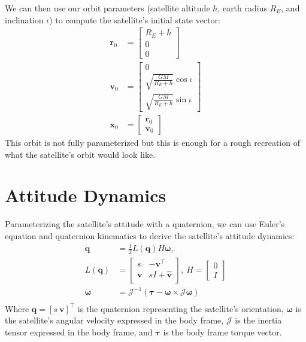 \documentclass[11pt]{article}
\begin{document}
We can then use our orbit parameters (satellite altitude $h$, earth radius $R_E$, and inclination $\iota$) to compute the satellite's initial state vector:
\begin{align*}
  \mathbf{r}_0 &= \begin{bmatrix} R_E + h \\ 0 \\ 0 \end{bmatrix} \\
  \mathbf{v}_0 &= \begin{bmatrix} 0 \\ \sqrt{\frac{GM}{R_E + h}} \cos\iota \\ \sqrt{\frac{GM}{R_E + h}} \sin\iota \end{bmatrix} \\
  \mathbf{x}_0 &= \begin{bmatrix} \mathbf{r}_0 \\ \mathbf{v}_0 \end{bmatrix}
\end{align*}
This orbit is not fully parameterized but this is enough for a rough recreation of what the satellite's orbit would look like.

\section{Attitude Dynamics}
Parameterizing the satellite's attitude with a quaternion, we can use Euler's equation and quaternion kinematics to derive the satellite's attitude dynamics:
\begin{align*}
  \dot{\mathbf{q}} &= \frac{1}{2} L(\mathbf{q}) H \boldsymbol{\omega}, \\ 
  L(\mathbf{q}) &= \begin{bmatrix}
    s & -\mathbf{v}^\top \\
    \mathbf{v} & sI + \mathbf{\hat{v}} \\
    \end{bmatrix}, \ 
    H = \begin{bmatrix}
      0 \\ I
  \end{bmatrix} \\
  \dot{\boldsymbol{\omega}} &= \mathcal{J}^{-1} \left( \boldsymbol{\tau} - \boldsymbol{\omega} \times \mathcal{J}\boldsymbol{\omega} \right) \\
\end{align*}
Where $\mathbf{q} = [s \ \mathbf{v}]^\top$ is the quaternion representing the satellite's orientation, $\boldsymbol{\omega}$ is the satellite's angular velocity expressed in the body frame, $\mathcal{J}$ is the inertia tensor expressed in the body frame, and $\boldsymbol{\tau}$ is the body frame torque vector.
\end{document}
